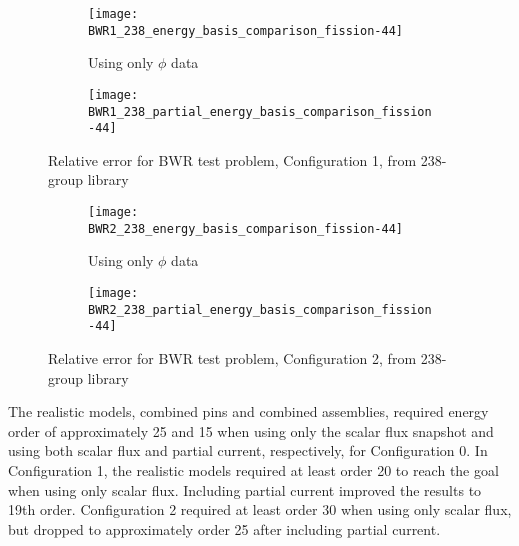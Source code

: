 \documentclass[5p,times,twocolumn,10pt]{elsarticle}
\begin{document}
  \begin{figure*}[!ht]
    \centering
    \begin{subfigure}{0.5\textwidth}
      \centering
      \texttt{[image: BWR1\_238\_energy\_basis\_comparison\_fission-44]}
      \caption{Using only $\phi$ data}
      \label{fig:core1-238a}
    \end{subfigure}%
    \begin{subfigure}{0.5\textwidth}
      \centering
      \texttt{[image: BWR1\_238\_partial\_energy\_basis\_comparison\_fission-44]}
      \label{fig:core1-238b} 
    \end{subfigure}
    \caption{Relative error for BWR test problem, Configuration 1, from 238-group library}
    \label{fig:core1-238}
  \end{figure*}
  
  \begin{figure*}[!ht]
    \centering
    \begin{subfigure}{0.5\textwidth}
      \centering
      \texttt{[image: BWR2\_238\_energy\_basis\_comparison\_fission-44]}
      \caption{Using only $\phi$ data}
      \label{fig:core2-238a}
    \end{subfigure}%
    \begin{subfigure}{0.5\textwidth}
      \centering
      \texttt{[image: BWR2\_238\_partial\_energy\_basis\_comparison\_fission-44]}
      \label{fig:core2-238b} 
    \end{subfigure}
    \caption{Relative error for BWR test problem, Configuration 2, from 238-group library}
    \label{fig:core2-238}
  \end{figure*}
  
  The realistic models, combined pins and combined assemblies, required energy order of approximately 25 and 15 when using only the 
  scalar flux snapshot and using both scalar flux and partial current, respectively, for Configuration 0.  In Configuration 1,
  the realistic models required at least order 20 to reach the goal when using only scalar flux.  Including partial current
  improved the results to 19th order.  Configuration 2 required at least order 30 when using only scalar flux, but dropped
  to approximately order 25 after including partial current.
  
\end{document}
